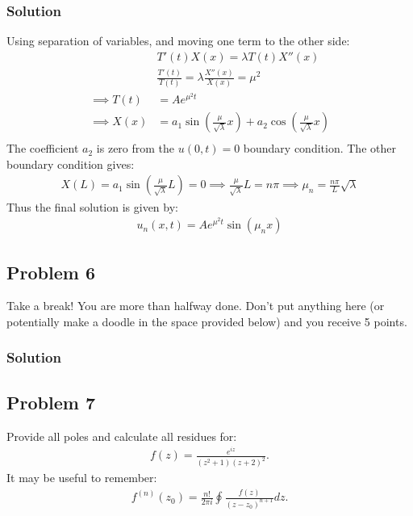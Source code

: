 \subsubsection*{Solution}
Using separation of variables, and moving one term to the other side:
\begin{align*}
    &T'(t)X(x) = \lambda T(t)X''(x)\\
    &\frac{T'(t)}{T(t)} = \lambda \frac{X''(x)}{X(x)} = \mu^2\\
    \implies T(t) &= Ae^{\mu^2 t}\\
    \implies X(x) &= a_1\sin\left(\frac{\mu}{\sqrt{\lambda}} x\right) + a_2\cos\left(\frac{\mu}{\sqrt{\lambda}} x\right)\\
\end{align*}The coefficient $a_2$ is zero from the $u(0,t) = 0$ boundary condition. The other boundary condition gives:
\begin{align*}
    X(L) = a_1\sin\left(\frac{\mu}{\sqrt{\lambda}} L\right) = 0\implies \frac{\mu}{\sqrt{\lambda}}L = n\pi\implies \mu_n = \frac{n\pi}{L}\sqrt{\lambda}
\end{align*}Thus the final solution is given by:
\begin{align*}
    u_n(x,t) = Ae^{\mu^2t}\sin\left(\mu_nx\right)
\end{align*}
\subsection*{Problem 6}
Take a break! You are more than halfway done. Don't put anything here (or potentially make a doodle in the space provided below) and you receive 5 points.

\subsubsection*{Solution}

\subsection*{Problem 7}
Provide all poles and calculate all residues for:
\begin{align*}
    f(z) = \frac{e^{iz}}{(z^2 + 1)(z+2)^2}.
\end{align*}It may be useful to remember:
\begin{align*}
    f^{(n)}(z_0) = \frac{n!}{2\pi i}\oint \frac{f(z)}{(z -z_0)^{n+1}}dz.
\end{align*}

